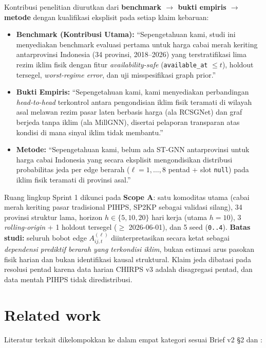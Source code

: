\documentclass[11pt,a4paper]{article}
\begin{document}
Kontribusi penelitian diurutkan dari \textbf{benchmark $\to$ bukti empiris $\to$ metode}
dengan kualifikasi eksplisit pada setiap klaim kebaruan:
\begin{itemize}
  \item \textbf{Benchmark (Kontribusi Utama):} ``Sepengetahuan kami, studi ini menyediakan
        benchmark evaluasi pertama untuk harga cabai merah keriting antarprovinsi Indonesia
        (34 provinsi, 2018--2026) yang terstratifikasi lima rezim iklim fisik dengan fitur
        \textit{availability-safe} (\texttt{available\_at} $\le t$), holdout tersegel,
        \textit{worst-regime error}, dan uji misspesifikasi graph prior.''
  \item \textbf{Bukti Empiris:} ``Sepengetahuan kami, kami menyediakan perbandingan
        \textit{head-to-head} terkontrol antara pengondisian iklim fisik teramati di wilayah
        asal melawan rezim pasar laten berbasis harga (ala RCSGNet) dan graf berjeda tanpa
        iklim (ala MillGNN), disertai pelaporan transparan atas kondisi di mana sinyal iklim
        tidak membantu.''
  \item \textbf{Metode:} ``Sepengetahuan kami, belum ada ST-GNN antarprovinsi untuk harga
        cabai Indonesia yang secara eksplisit mengondisikan distribusi probabilitas jeda
        per edge berarah ($\ell=1,\dots,8$ pentad + slot \texttt{null}) pada iklim fisik
        teramati di provinsi asal.''
\end{itemize}

Ruang lingkup Sprint 1 dikunci pada \textbf{Scope A}: satu komoditas utama (cabai merah
keriting pasar tradisional PIHPS, SP2KP sebagai validasi silang), 34 provinsi struktur lama,
horizon $h \in \{5, 10, 20\}$ hari kerja (utama $h=10$), 3 \textit{rolling-origin} + 1 holdout
tersegel ($\ge$ 2026-06-01), dan 5 seed (\texttt{0..4}). \textbf{Batas studi:} seluruh bobot
edge $A^{(\ell)}_{ij,t}$ diinterpretasikan secara ketat sebagai \textit{dependensi prediktif
berarah yang terkondisi iklim}, bukan estimasi arus pasokan fisik harian dan bukan identifikasi
kausal struktural. Klaim jeda dibatasi pada resolusi pentad karena data harian CHIRPS v3
adalah disagregasi pentad, dan data mentah PIHPS tidak diredistribusi.

\section{Related work}
Literatur terkait dikelompokkan ke dalam empat kategori sesuai Brief v2 \S2 dan
:
\end{document}
